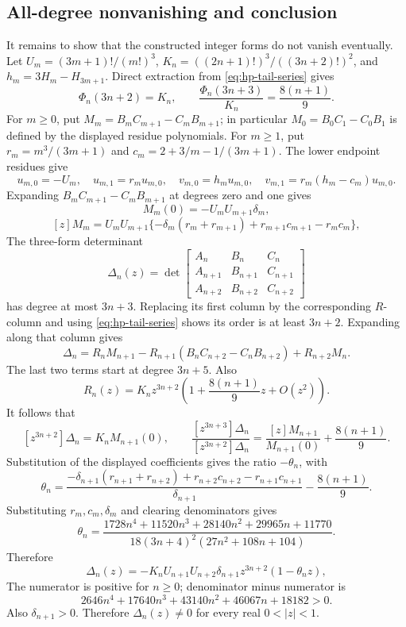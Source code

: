 \subsection{All-degree nonvanishing and conclusion}
It remains to show that the constructed integer forms do not vanish
eventually.
Let $U_m=(3m+1)!/(m!)^3$,
$K_n=((2n+1)!)^3/((3n+2)!)^2$, and
$h_m=3H_m-H_{3m+1}$.  Direct extraction from
\eqref{eq:hp-tail-series} gives
\[
 \Phi_n(3n+2)=K_n,\qquad
 \frac{\Phi_n(3n+3)}{K_n}=\frac{8(n+1)}9.
\]
For $m\ge0$, put $M_m=B_mC_{m+1}-C_mB_{m+1}$; in particular
$M_0=B_0C_1-C_0B_1$ is defined by the displayed residue polynomials.
For $m\ge1$, put $r_m=m^3/(3m+1)$ and $c_m=2+3/m-1/(3m+1)$.
The lower endpoint residues give
\[
 u_{m,0}=-U_m,\quad u_{m,1}=r_m u_{m,0},\quad
 v_{m,0}=h_m u_{m,0},\quad
 v_{m,1}=r_m(h_m-c_m)u_{m,0}.
\]
Expanding $B_mC_{m+1}-C_mB_{m+1}$ at degrees zero and one gives
\[
 M_m(0)=-U_mU_{m+1}\delta_m,
\]
\[
 [z]M_m=U_mU_{m+1}
 \{-\delta_m(r_m+r_{m+1})+r_{m+1}c_{m+1}-r_mc_m\},
\]
The three-form determinant
\[
 \Delta_n(z)=\det\begin{bmatrix}
 A_n&B_n&C_n\\ A_{n+1}&B_{n+1}&C_{n+1}\\ A_{n+2}&B_{n+2}&C_{n+2}
 \end{bmatrix}
\]
has degree at most $3n+3$.  Replacing its first column by the corresponding
$R$-column and using \eqref{eq:hp-tail-series} shows its order is at least
$3n+2$.  Expanding along that column gives
\[
 \Delta_n=R_nM_{n+1}
 -R_{n+1}(B_nC_{n+2}-C_nB_{n+2})+R_{n+2}M_n.
\]
The last two terms start at degree $3n+5$.  Also
\[
 R_n(z)=K_nz^{3n+2}\left(1+\frac{8(n+1)}9z+O(z^2)\right).
\]
It follows that
\[
 [z^{3n+2}]\Delta_n=K_nM_{n+1}(0),\qquad
 \frac{[z^{3n+3}]\Delta_n}{[z^{3n+2}]\Delta_n}
 =\frac{[z]M_{n+1}}{M_{n+1}(0)}+\frac{8(n+1)}9.
\]
Substitution of the displayed coefficients gives the ratio $-\theta_n$, with
\[
 \theta_n=
 \frac{-\delta_{n+1}(r_{n+1}+r_{n+2})
       +r_{n+2}c_{n+2}-r_{n+1}c_{n+1}}{\delta_{n+1}}
       -\frac{8(n+1)}9.
\]
Substituting $r_m,c_m,\delta_m$ and clearing denominators gives
\begin{equation}\label{eq:hp-theta}
 \theta_n=\frac{1728n^4+11520n^3+28140n^2+29965n+11770}
 {18(3n+4)^2(27n^2+108n+104)}.
\end{equation}
Therefore
\begin{equation}\label{eq:hp-delta}
 \Delta_n(z)=-K_nU_{n+1}U_{n+2}\delta_{n+1}z^{3n+2}(1-\theta_nz),
\end{equation}
The numerator is positive for $n\ge0$; denominator minus numerator is
\[
 2646n^4+17640n^3+43140n^2+46067n+18182>0.
\]
Also $\delta_{n+1}>0$.  Therefore $\Delta_n(z)\ne0$ for every real
$0<|z|<1$.

